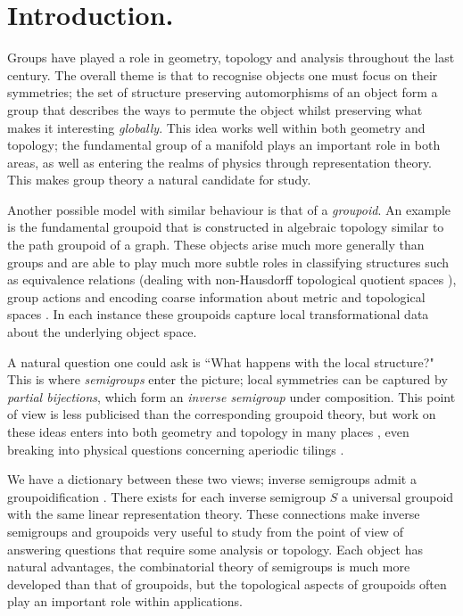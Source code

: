 \chapter{Introduction.}

Groups have played a role in geometry, topology and analysis throughout the last century. The overall theme is that to recognise objects one must focus on their symmetries; the set of structure preserving automorphisms of an object form a group that describes the ways to permute the object whilst preserving what makes it interesting \textit{globally}. This idea works well within both geometry and topology; the fundamental group of a manifold plays an important role in both areas, as well as entering the realms of physics through representation theory. This makes group theory a natural candidate for study.

Another possible model with similar behaviour is that of a \textit{groupoid}. An example is the fundamental groupoid that is constructed in algebraic topology similar to the path groupoid of a graph. These objects arise much more generally than groups and are able to play much more subtle roles in classifying structures such as equivalence relations (dealing with non-Hausdorff topological quotient spaces \cite{MR1826266}), group actions and encoding coarse information about metric and topological spaces \cite{MR1905840}. In each instance these groupoids capture local transformational data about the underlying object space.

A natural question one could ask is ``What happens with the local structure?" This is where \textit{semigroups} enter the picture; local symmetries can be captured by \textit{partial bijections}, which form an \textit{inverse semigroup} under composition. This point of view is less publicised than the corresponding groupoid theory, but work on these ideas enters into both geometry and topology in many places \cite{MR0160848,MR1694900,MR1798993}, even breaking into physical questions concerning aperiodic tilings \cite{MR1798993,MR2041539}.

We have a dictionary between these two views; inverse semigroups admit a groupoidification \cite{MR1724106,MR2419901}. There exists for each inverse semigroup $S$ a universal groupoid with the same linear representation theory. These connections make inverse semigroups and groupoids very useful to study from the point of view of answering questions that require some analysis or topology. Each object has natural advantages, the combinatorial theory of semigroups is much more developed than that of groupoids, but the topological aspects of groupoids often play an important role within applications.

